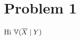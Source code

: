 \documentclass[12pt]{article}
\begin{document}
\section*{Problem 1}
Hi $\mathbb{V} (\overline{X} \mid Y) $
\end{document}
